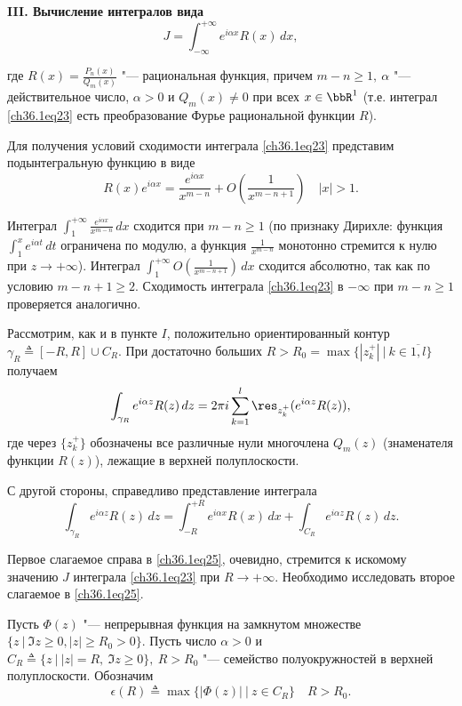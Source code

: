 \begin{leftbar}
{\bf III. Вычисление интегралов вида}
\begin{equation} \label{ch36.1eq23}
J = \int_{-\infty}^{+\infty} e^{i\alpha x} R(x) \,dx,
\end{equation}

где $R(x) = \frac{P_n(x)}{Q_m(x)}$ "--- рациональная функция, причем $m - n \ge 1, \: \alpha$ "--- действительное число, $\alpha > 0$ и $Q_m(x) \not= 0$ при всех $x \in \bbR^1$ (т.е. интеграл \eqref{ch36.1eq23} есть преобразование Фурье рациональной функции $R$).

Для получения условий сходимости интеграла \eqref{ch36.1eq23} представим подынтегральную функцию в виде
$$
R(x) e^{i \alpha x} = \frac{e^{i \alpha x}}{x^{m - n}} + O \left( \frac{1}{x^{m - n + 1}} \right) \quad |x| > 1.
$$

Интеграл $\int_1^{+\infty} \frac{e^{i \alpha x}}{x^{m - n}} \,dx$ сходится при $m - n \ge 1$ (по признаку Дирихле: функция $\int_1^x e^{i\alpha t}\,dt$ ограничена по модулю, а функция $\frac{1}{x^{m - n}}$ монотонно стремится к нулю при $z \to +\infty$). Интеграл 
$\int_{1}^{+\infty} O \left( \frac{1}{x^{m - n + 1}} \right)\,dx$ сходится абсолютно, так как по условию $m - n + 1 \ge 2$. Сходимость интеграла \eqref{ch36.1eq23} в $-\infty$ при $m - n \ge 1$ проверяется аналогично.

Рассмотрим, как и в пункте $I$, положительно ориентированный контур $\gamma_R \triangleq [-R,R] \cup C_R$. При достаточно больших $R > R_0 = \max \{ |z_k^+| \: \big| \: k \in \overline{1,l} \}$ получаем
\begin{equation} \label{ch36.1eq24}
\int_{\gamma_R} e^{i \alpha z}R(z) \,dz = 2\pi i \sum_{k = 1}^l \res_{z_k^+} (e^{i\alpha z}R(z)),
\end{equation}
где через $\{ z_k^+ \}$ обозначены все различные нули многочлена $Q_m(z)$ (знаменателя функции $R(z)$), лежащие в верхней полуплоскости.

С другой стороны, справедливо представление интеграла 
\begin{equation} \label{ch36.1eq25}
\int_{\gamma_R} e^{i \alpha z}R(z)\,dz = \int_{-R}^{+R} e^{i \alpha x}R(x)\,dx + \int_{C_R} e^{i \alpha z} R(z)\,dz.
\end{equation}

Первое слагаемое справа в \eqref{ch36.1eq25}, очевидно, стремится к искомому значению $J$ интеграла \eqref{ch36.1eq23} при $R \to +\infty$. Необходимо исследовать второе слагаемое в \eqref{ch36.1eq25}.

\begin{lemm} [Жордана] \label{ch36.1lemm5}
Пусть $\Phi(z)$ "--- непрерывная функция на замкнутом множестве $\{ z \: \big| \: \Im z \ge 0, |z| \ge R_0 > 0 \}$. Пусть число $\alpha > 0$ и $C_R \triangleq \{ z \: \big| \: |z| = R, \: \Im z \ge 0 \}, \: R > R_0$ "--- семейство полуокружностей в верхней полуплоскости. Обозначим
$$
\epsilon(R) \triangleq \max \{ |\Phi(z)| \: \big| \: z \in C_R \} \quad R > R_0.
$$


\end{lemm}
\end{leftbar}
